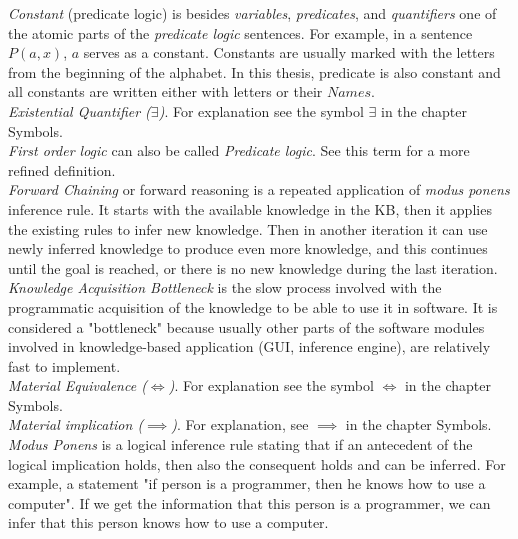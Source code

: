 \emph{Constant} (predicate logic) is besides \emph{variables}, 
\emph{predicates}, and \emph{quantifiers} one of the atomic parts of the 
\emph{predicate logic} sentences. For example, in a sentence $P(a,x)$, $a$ 
serves as a constant. Constants are usually marked with the letters from the
beginning of the alphabet. In this thesis, predicate is also constant and
all constants are written either with letters or their $Names$.\\

\emph{Existential Quantifier ($\exists$)}. For explanation see the symbol
$\exists$ in the chapter Symbols.\\

\emph {First order logic} can also be called \emph{Predicate logic}. See this
term for a more refined definition.\\

\emph{Forward Chaining} or forward reasoning is a repeated application of
\emph{modus ponens} inference rule. It starts with the available knowledge in 
the KB, then it applies the existing rules to infer new knowledge. Then in
another iteration it can use newly inferred knowledge to produce even more 
knowledge, and this continues until the goal is reached, or there is no new
knowledge during the last iteration.\\

\emph{Knowledge Acquisition Bottleneck} is the slow process involved with
the programmatic acquisition of the knowledge to be able to use it in software.
It is considered a "bottleneck" because usually other parts of the software
modules involved in knowledge-based application (GUI, inference engine), are
relatively fast to implement.\\

\emph{Material Equivalence ($\iff$)}. For explanation see the symbol $\iff$ in the
chapter Symbols.\\

\emph{Material implication ($\implies$)}. For explanation, see $\implies$ in the
chapter Symbols.\\

\emph{Modus Ponens} is a logical inference rule stating that if an antecedent
of the logical implication holds, then also the consequent holds and can be
inferred. For example, a statement "if person is a 
programmer, then he knows how to use a computer". If we get the information
that this person is a programmer, we can infer that this person knows how to
use a computer. \\

